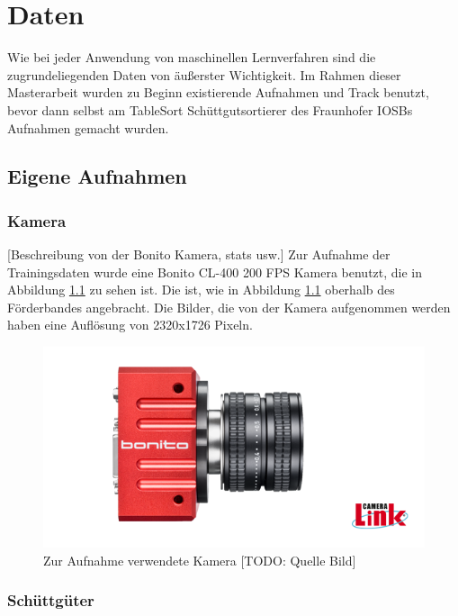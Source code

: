 \chapter{Daten}

Wie bei jeder Anwendung von maschinellen Lernverfahren sind die zugrundeliegenden Daten von äußerster Wichtigkeit.
Im Rahmen dieser Masterarbeit wurden zu Beginn existierende Aufnahmen und Track benutzt, 
bevor dann selbst am TableSort Schüttgutsortierer des Fraunhofer IOSBs Aufnahmen gemacht wurden.


\section{Eigene Aufnahmen}

\subsection{Kamera}

[Beschreibung von der Bonito Kamera, stats usw.]
Zur Aufnahme der Trainingsdaten wurde eine Bonito CL-400 200 FPS Kamera benutzt, die in Abbildung \ref{pictureCam} zu sehen ist.
Die ist, wie in Abbildung \ref{pictureCam} oberhalb des Förderbandes angebracht.
Die Bilder, die von der Kamera aufgenommen werden haben eine Auflösung von 2320x1726 Pixeln.

\begin{figure}
    \centering
    \includegraphics[width=\textwidth]{img/banner-Bonito_cropped}
    \caption{Zur Aufnahme verwendete Kamera [TODO: Quelle Bild]}
    \label{pictureCam}
\end{figure}

\subsection{Schüttgüter}


